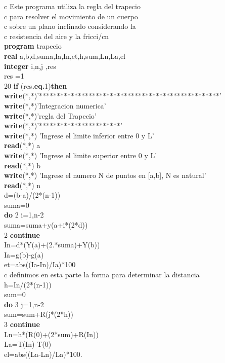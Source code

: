 \documentclass{article}
\begin{document}
c Este programa utiliza la regla del trapecio\\
c para resolver el movimiento de un cuerpo\\
c sobre un plano inclinado considerando la\\
c resistencia del aire y la fricci\hbox{\rm\rlap/c}n \\
\textbf{program }trapecio \\
\textbf{real }a,b,d,suma,Ia,In,et,h,sum,Ln,La,el \\
\textbf{integer }i,n,j ,res \\
res =1\\
20 \textbf{if }(res\textbf{.eq.}1)\textbf{then \\
write}(*,*)'***************************************************' 
\\
\textbf{write}(*,*)'Integracion numerica' \\
\textbf{write}(*,*)'regla del Trapecio' \\
\textbf{write}(*,*)'***********************' \\
\textbf{write}(*,*) 'Ingrese el limite inferior entre 0 y L' \\
\textbf{read}(*,*) a \\
\textbf{write}(*,*) 'Ingrese el limite superior entre 0 y L' \\
\textbf{read}(*,*) b \\
\textbf{write}(*,*) 'Ingrese el numero N de puntos en [a,b], N es 
natural' \\
\textbf{read}(*,*) n \\
d=(b-a)/(2*(n-1)) \\
suma=0 \\
\textbf{do }2 i=1,n-2 \\
suma=suma+y(a+i*(2*d))\\
2 \textbf{continue }\\
In=d*(Y(a)+(2.*suma)+Y(b)) \\
Ia=g(b)-g(a) \\
et=abs((Ia-In)/Ia)*100\\
c definimos en esta parte la forma para determinar la distancia 
\\
h=In/(2*(n-1)) \\
sum=0 \\
\textbf{do }3 j=1,n-2 \\
sum=sum+R(j*(2*h))\\
3 \textbf{continue }\\
Ln=h*(R(0)+(2*sum)+R(In)) \\
La=T(In)-T(0) \\
el=abs((La-Ln)/La)*100. 
\end{document}
